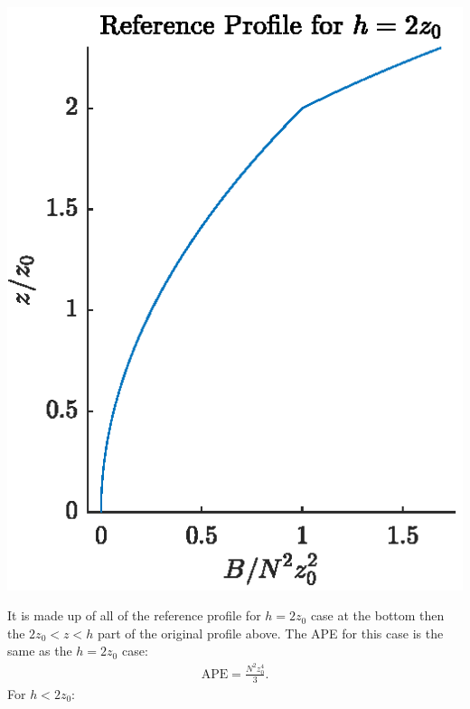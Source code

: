 \documentclass[11pt,letterpaper]{book}
\theoremstyle{definition}
\newcommand{\APE}{\text{APE}}
\begin{document}
\begin{center}
\includegraphics[scale=1]{Fig/hgg2z0}
\end{center}
It is made up of all of the reference profile for $h = 2z_0$ case at the bottom then the $2z_0<z<h$ part of the original profile above. The APE for this case is the same as the $h = 2z_0$ case:
\begin{align*}
\APE = \frac{N^2 z_0^4}{3}.
\end{align*}
For $h<2z_0$:
\end{document}

